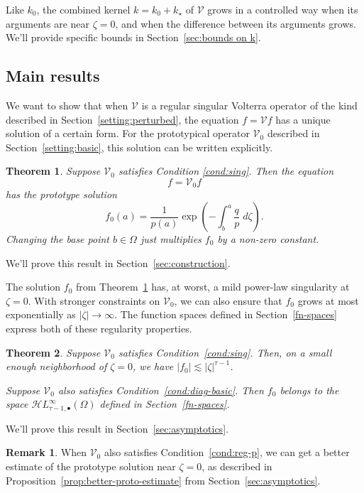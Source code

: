 \documentclass{article}
\theoremstyle{definition}
\newtheorem{rmk}{Remark}
\theoremstyle{plain}
\newtheorem{thm}{Theorem}
\newcommand{\singexp}[2]{\mathcal{H}L^\infty_{#1, #2}}
\newcommand{\singexpalg}[1]{\singexp{#1}{\bullet}}
\newcommand{\volterra}{\mathcal{V}}
\newcommand{\hardpart}{\mathcal{V}_0}
\newcommand{\hardker}{k_0}
\newcommand{\softker}{k_\star}
\newcommand{\solproto}{f_0}
\newcommand{\domain}{\Omega}
\begin{document}
Like $\hardker$, the combined kernel $k = \hardker + \softker$ of $\volterra$ grows in a controlled way when its arguments are near $\zeta = 0$, and when the difference between its arguments grows. We'll provide specific bounds in Section~\ref{sec:bounds on k}. 

\subsection{Main results}\label{sec:results}
We want to show that when $\volterra$ is a regular singular Volterra operator of the kind described in Section~\ref{setting:perturbed}, the equation $f = \volterra f$ has a unique solution of a certain form. For the prototypical operator $\hardpart$ described in Section~\ref{setting:basic}, this solution can be written explicitly.
\begin{thm}\label{thm:basic_volterra}
Suppose $\hardpart$ satisfies {\em Condition \eqref{cond:sing}}. Then the equation
\[ f = \hardpart f \]
has the {\em prototype solution}
\begin{equation}\label{eqn:test_solution}
\solproto(a) = \frac{1}{p(a)} \exp\left(-\int_{b}^{a}\frac{q}{p}\;d\zeta\right).
\end{equation}
Changing the base point $b \in \domain$ just multiplies $f_0$ by a non-zero constant.
\end{thm}
We'll prove this result in Section~\ref{sec:construction}.

The solution $\solproto$ from Theorem~\ref{thm:basic_volterra} has, at worst, a mild power-law singularity at $\zeta = 0$. With stronger constraints on $\hardpart$, we can also ensure that $\solproto$ grows at most exponentially as $|\zeta| \to \infty$. The function spaces defined in Section~\ref{fn-spaces} express both of these regularity properties.
\begin{thm}\label{thm:proto-growth}
Suppose $\hardpart$ satisfies {\em Condition~\eqref{cond:sing}}. Then, on a small enough neighborhood of $\zeta = 0$, we have $|\solproto| \lesssim |\zeta|^{\tau-1}$.

Suppose $\hardpart$ also satisfies {\em Condition~\eqref{cond:diag-basic}}. Then $f_0$ belongs to the space $\singexpalg{\tau-1}(\domain)$ defined in Section~\ref{fn-spaces}.
\end{thm}
We'll prove this result in Section~\ref{sec:asymptotics}.
\begin{rmk}
When $\hardpart$ also satisfies Condition~\eqref{cond:reg-p}, we can get a better estimate of the prototype solution near $\zeta = 0$, as described in Proposition~\ref{prop:better-proto-estimate} from Section~\ref{sec:asymptotics}.
\end{rmk}
\end{document}
